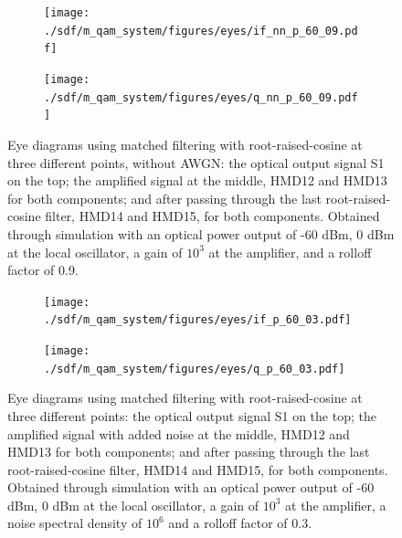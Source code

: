 \begin{figure}[H]
	\centering
	\begin{subfigure}{.45\textwidth}
		\centering
		\texttt{[image: ./sdf/m\_qam\_system/figures/eyes/if\_nn\_p\_60\_09.pdf]}
	\end{subfigure}
	\begin{subfigure}{.45\textwidth}
		\centering
		\texttt{[image: ./sdf/m\_qam\_system/figures/eyes/q\_nn\_p\_60\_09.pdf]}
	\end{subfigure}
	
	\caption{Eye diagrams using matched filtering with root-raised-cosine at three different points, without AWGN: the optical output signal S1 on the top; the amplified signal at the middle, HMD12 and HMD13 for both components; and after passing through the last root-raised-cosine filter, HMD14 and HMD15, for both components. Obtained through simulation with an optical power output of -60 dBm, 0 dBm at the local oscillator, a gain of $10^3$ at the amplifier, and a rolloff factor of 0.9.}
	\label{fig:test}
\end{figure}

\begin{figure}[H]
	\centering
		\begin{subfigure}{.45\textwidth}
		\centering
		\texttt{[image: ./sdf/m\_qam\_system/figures/eyes/if\_p\_60\_03.pdf]}
	\end{subfigure}
	\begin{subfigure}{.45\textwidth}
		\centering
		\texttt{[image: ./sdf/m\_qam\_system/figures/eyes/q\_p\_60\_03.pdf]}
	\end{subfigure}

	\caption{Eye diagrams using matched filtering with root-raised-cosine at three different points: the optical output signal S1 on the top; the amplified signal with added noise at the middle, HMD12 and HMD13 for both components; and after passing through the last root-raised-cosine filter, HMD14 and HMD15, for both components. Obtained through simulation with an optical power output of -60 dBm, 0 dBm at the local oscillator, a gain of $10^3$ at the amplifier, a noise spectral density of $10^6$ and a rolloff factor of 0.3.}
	\label{fig:test}
\end{figure}

